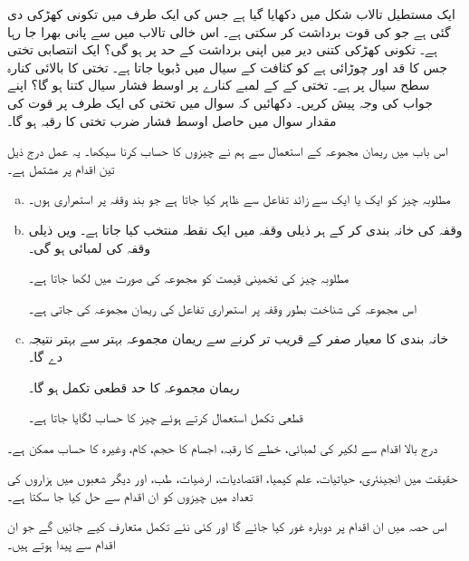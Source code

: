 ایک مستطیل تالاب شکل  میں دکھایا گیا ہے جس کی ایک طرف میں تکونی کھڑکی دی گئی ہے جو  کی قوت برداشت کر سکتی ہے۔ اس خالی تالاب میں  سے پانی بھرا جا رہا ہے۔ تکونی کھڑکی کتنی دیر میں اپنی برداشت کے حد پر ہو گی؟
ایک انتصابی تختی جس کا قد  اور چوڑائی  ہے کو کثافت  کے سیال میں ڈبویا جاتا ہے۔ تختی کا بالائی کنارہ سطح سیال پر ہے۔ تختی کے کے لمبے کنارے پر اوسط فشار سیال کتنا ہو گا؟ اپنے جواب کی وجہ پیش کریں۔ 
دکھائیں کہ سوال  میں تختی کی ایک طرف پر قوت کی مقدار سوال  میں حاصل اوسط فشار ضرب تختی کا رقبہ ہو گا۔


اس باب میں ریمان مجموعہ کے استعمال سے ہم نے چیزوں کا حساب کرنا سیکھا۔ یہ عمل درج ذیل تین اقدام پر مشتمل ہے۔
\begin{enumerate}[a.]
\item
مطلوبہ چیز کو ایک یا ایک سے زائد تفاعل سے ظاہر کیا جاتا ہے جو بند وقفہ  پر استمراری ہوں۔
\item
وقفہ  کی خانہ بندی کر کے ہر ذیلی وقفہ میں ایک نقطہ  منتخب کیا جاتا ہے۔  ویں ذیلی وقفہ کی لمبائی   ہو گی۔ 

مطلوبہ چیز کی تخمینی قیمت کو مجموعہ کی صورت میں لکھا جاتا ہے۔

اس مجموعہ کی شناخت بطور وقفہ  پر استمراری تفاعل کی ریمان مجموعہ کی جاتی ہے۔
\item
خانہ بندی کا معیار صفر کے قریب تر کرنے سے ریمان مجموعہ بہتر سے بہتر نتیجہ دے گا۔

ریمان مجموعہ کا حد قطعی تکمل ہو گا۔

قطعی تکمل استعمال کرتے ہوئے چیز کا حساب لگایا جاتا ہے۔
\end{enumerate}

درج بالا اقدام سے لکیر کی لمبائی، خطے کا رقبہ، اجسام کا حجم، کام، وغیرہ کا حساب ممکن ہے۔

حقیقت میں انجینئری، حیاتیات، علم کیمیا، اقتصادیات، ارضیات، طب، اور دیگر شعبوں میں ہزاروں کی تعداد میں چیزوں کو ان اقدام سے حل کیا جا سکتا ہے۔

اس حصہ میں ان اقدام پر دوبارہ غور کیا جائے گا اور کئی نئے تکمل متعارف کیے جائیں گے جو ان اقدام سے پیدا ہوتے ہیں۔

